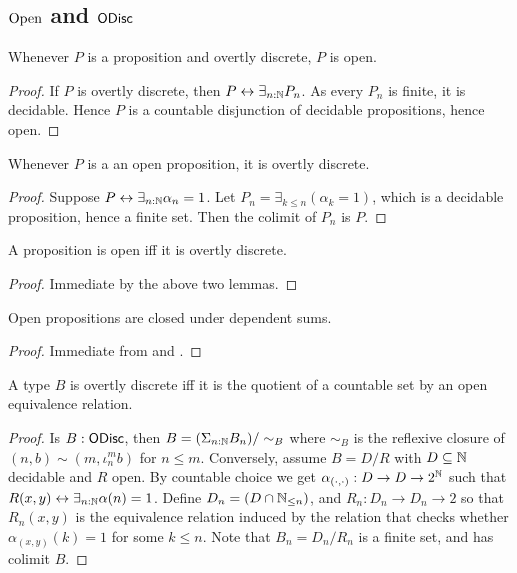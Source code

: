 
\subsection{$\mathrm{Open}$ and $\mathsf{ODisc}$} %
\begin{lemma}
  Whenever $P$ is a proposition and overtly discrete, $P$ is open. 
\end{lemma}
\begin{proof}
  If $P$ is overtly discrete, then $P\leftrightarrow \exists_{n:\mathbb{N}} P_n$. 
  As every $P_n$ is finite, it is decidable. 
  Hence $P$ is a countable disjunction of decidable propositions, hence open.%
\end{proof}
\begin{lemma}
  Whenever $P$ is a an open proposition, it is overtly discrete.
\end{lemma}
\begin{proof}
  Suppose $P\leftrightarrow \exists_{n:\mathbb{N}} \alpha_n = 1$. 
  Let $P_n = \exists_{k\leq n} (\alpha_k = 1)$, which is a decidable proposition, hence a finite set. 
  Then the colimit of $P_n$ is $P$. 
\end{proof} 
\begin{corollary}\label{PropOpenIffOdisc}
  A proposition is open iff it is overtly discrete.
\end{corollary}
\begin{proof}
  Immediate by the above two lemmas. 
\end{proof}
\begin{corollary}\label{OpenDependentSums}
  Open propositions are closed under dependent sums. 
\end{corollary}
\begin{proof}
  Immediate from  and .
\end{proof}
\begin{lemma}\label{OdiscQuotientCountableByOpen}\label{ODiscEqualityOpen}
  A type $B$ is overtly discrete iff it is the quotient of a countable set by an open equivalence relation. 
\end{lemma}
\begin{proof}
  Is $B:\mathsf{ODisc}$, then $B= (\Sigma_{n:\mathbb{N}} B_n)/\sim_B$ where $\sim_B$ is the reflexive closure of  
  $(n,b)\sim(m,\iota_n^m b)$ for $n\leq m$. 
%
  Conversely, assume $B= D/R$ with $D\subseteq \mathbb{N}$ decidable and $R$ open. 
  By countable choice we get $\alpha_{(\cdot,\cdot)}:D \to D \to 2^{\mathbb{N}}$ such that 
  $R(x,y)\leftrightarrow \exists_{n:\mathbb{N}}\alpha(n) = 1$. 
  Define $D_n = (D \cap \mathbb{N}_{\leq n})$, and $R_n : D_n \to D_n \to 2$ so that 
  $R_n(x,y)$ is the equivalence relation induced by the relation that checks whether
  $\alpha_{(x,y)}(k) =1$ for some $k\leq n$. 
  Note that $B_n = D_n/R_n$ is a finite set, and has colimit $B$. 
\end{proof}
